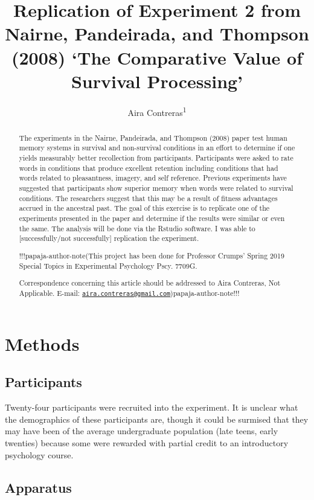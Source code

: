\documentclass[man]{apa6}
\title{Replication of Experiment 2 from Nairne, Pandeirada, and Thompson (2008) `The Comparative Value of Survival Processing'}
\author{Aira Contreras\textsuperscript{1}}
\date{}
\affiliation{
\vspace{0.5cm}
\textsuperscript{1} Brooklyn College of the City University of New York}
\begin{document}
\maketitle
\begin{abstract}
The experiments in the Nairne, Pandeirada, and Thompson (2008) paper test human memory systems in survival and non-survival conditions in an effort to determine if one yields measurably better recollection from participants. Participants were asked to rate words in conditions that produce excellent retention including conditions that had words related to pleasantness, imagery, and self reference. Previous experiments have suggested that participants show superior memory when words were related to survival conditions. The researchers suggest that this may be a result of fitness advantages accrued in the ancestral past. The goal of this exercise is to replicate one of the experiments presented in the paper and determine if the results were similar or even the same. The analysis will be done via the Rstudio software. I was able to {[}successfully/not successfully{]} replication the experiment.

!!!papaja-author-note(This project has been done for Professor Crumps' Spring 2019 Special Topics in Experimental Psychology Pscy. 7709G.

Correspondence concerning this article should be addressed to Aira Contreras, Not Applicable. E-mail: \href{mailto:aira.contreras@gmail.com}{\nolinkurl{aira.contreras@gmail.com}})papaja-author-note!!!
\end{abstract}

\hypertarget{methods}{%
\section{Methods}\label{methods}}

\hypertarget{participants}{%
\subsection{Participants}\label{participants}}

Twenty-four participants were recruited into the experiment. It is unclear what the demographics of these participants are, though it could be surmised that they may have been of the average undergraduate population (late teens, early twenties) because some were rewarded with partial credit to an introductory psychology course.

\hypertarget{apparatus}{%
\subsection{Apparatus}\label{apparatus}}
\end{document}
